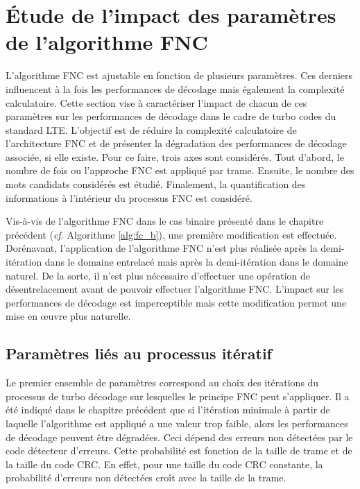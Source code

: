 \section{Étude de l'impact des paramètres de l'algorithme FNC}
L'algorithme FNC est ajustable en fonction de plusieurs paramètres. Ces derniers influencent à la fois les performances de décodage mais également
la complexité calculatoire. Cette section vise à caractériser l'impact de chacun de ces paramètres sur les performances de 
décodage dans le cadre de turbo codes du standard LTE. L'objectif est de réduire la complexité calculatoire de 
l'architecture FNC et de présenter la dégradation des performances de décodage associée, si elle existe. Pour ce faire, 
trois axes sont considérés. Tout d'abord, le nombre de fois ou l'approche FNC est appliqué par trame. Ensuite, 
le nombre des mots candidats considérés est étudié. Finalement, la quantification des informations à l'intérieur du 
processus FNC est considéré.

Vis-à-vis de l'algorithme FNC dans le cas binaire présenté dans le chapitre précédent (\textit{cf.} Algorithme \ref{alg:fc_b}), une première modification est effectuée. 
Dorénavant, l'application de l'algorithme FNC n'est plus réalisée après la demi-itération dans le domaine
entrelacé mais après la demi-itération dans le domaine naturel. De la sorte, il n'est plus nécessaire d'effectuer une 
opération de désentrelacement avant de pouvoir effectuer l'algorithme FNC. L'impact sur les performances de décodage est
imperceptible mais cette modification permet une mise en œuvre plus naturelle.

\subsection{Paramètres liés au processus itératif}
Le premier ensemble de paramètres correspond au choix des itérations du processus de turbo décodage sur lesquelles le 
principe FNC peut s'appliquer. Il a été indiqué dans le chapitre précédent que si l'itération minimale à partir de 
laquelle l'algorithme est appliqué a une valeur trop faible, alors les performances de décodage peuvent être dégradées. Ceci dépend 
des erreurs non détectées par le code détecteur d'erreurs. Cette probabilité est fonction de la taille de trame et de la 
taille du code CRC. En effet, pour une taille du code CRC constante, la probabilité d'erreurs non détectées croît avec la
taille de la trame. 


